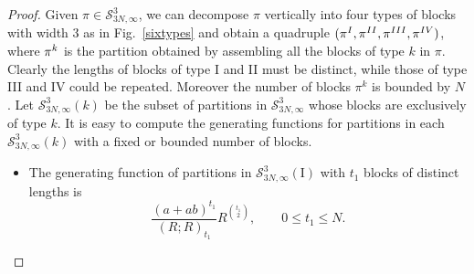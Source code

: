 \documentclass[12pt]{amsart}
\numberwithin{equation}{section}
\theoremstyle{plain}
\theoremstyle{definition}
\begin{document}
\begin{proof}
Given $\pi\in\mathcal{S}^3_{3N,\infty}$, we can  decompose $\pi$ vertically
 into four types of blocks with width $3$ as in Fig.~\ref{sixtypes} and obtain a quadruple 
  $(\pi^{\sc I}, \pi^{\sc{II}}, \pi^{\sc{III}}, \pi^{\sc{IV}})$,  where $\pi^{\sc k}$ is 
  the partition obtained by assembling all the blocks of type $k$ in $\pi$. 
  Clearly the lengths of blocks of type I and II must be distinct, while those of type III and IV could be 
  repeated. Moreover the number of blocks $\pi^k$  is bounded by $N$. 
  Let $\mathcal{S}^3_{3N,\infty}(k)$ be the subset of partitions in $\mathcal{S}^3_{3N,\infty}$ whose blocks are exclusively of type $k$.  It is easy to 
 compute the generating functions   for   partitions in each $\mathcal{S}^3_{3N,\infty}(k)$ with a fixed  or bounded number of blocks.
\begin{itemize}
\item[I.] The generating function of partitions in $\mathcal{S}^3_{3N,\infty}(\text{I})$ with  
$t_1$ blocks of distinct lengths  is 
$$
\dfrac{(a+ab)^{t_1}}{(R;R)_{t_1}}R^{\binom{t_1}{2}}, \qquad 0\leq  t_1\leq N.
$$ 



\end{itemize}
\end{proof}
\end{document}

